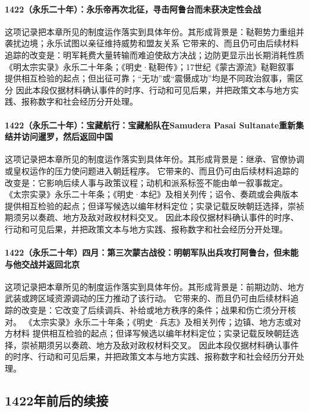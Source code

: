 \paragraph{1422（永乐二十年）：永乐帝再次北征，寻击阿鲁台而未获决定性会战} 这项记录把本章所见的制度运作落实到具体年份。其形成背景是：鞑靼势力重组并袭扰边境；永乐试图以亲征维持威势和盟友关系 它带来的、而且仍可由后续材料追踪的改变是：明军耗费大量转输而难迫使敌方决战；边防更显示出长期消耗性质 《明太宗实录》永乐二十年条；《明史·鞑靼传》；17世纪《蒙古源流》鞑靼叙事 提供相互检验的起点；但出征可靠；“无功”或“震慑成功”均是不同政治叙事，需区分 因此本段仅据材料确认事件的时序、行动和可见后果，并把政策文本与地方实践、报称数字和社会经历分开处理。

\paragraph{1422（永乐二十年）：宝藏航行：宝藏船队在Samudera Pasai Sultanate重新集结并访问暹罗，然后返回中国} 这项记录把本章所见的制度运作落实到具体年份。其形成背景是：继承、官僚协调或皇权运作的压力使问题进入朝廷程序。 它带来的、而且仍可由后续材料追踪的改变是：它影响后续人事与政策议程；动机和派系标签不能由单一叙事裁定。 《太宗实录》永乐二十年条；《明史·本纪》及相关列传；诏令、奏疏或会典版本 提供相互检验的起点；但译写候选以编年材料定位；实录记载反映朝廷选择，崇祯期须另以奏疏、地方及敌对政权材料交叉。 因此本段仅据材料确认事件的时序、行动和可见后果，并把政策文本与地方实践、报称数字和社会经历分开处理。

\paragraph{1422（永乐二十年）四月：第三次蒙古战役：明朝军队出兵攻打阿鲁台，但未能与他交战并返回北京} 这项记录把本章所见的制度运作落实到具体年份。其形成背景是：前期边防、地方武装或跨区域资源调动的压力推动了该行动。 它带来的、而且仍可由后续材料追踪的改变是：它改变了后续调兵、补给或地方秩序的条件；战果和伤亡须分开核对。 《太宗实录》永乐二十年条；《明史·兵志》及相关列传；边镇、地方志或对方材料 提供相互检验的起点；但译写候选以编年材料定位；实录记载反映朝廷选择，崇祯期须另以奏疏、地方及敌对政权材料交叉。 因此本段仅据材料确认事件的时序、行动和可见后果，并把政策文本与地方实践、报称数字和社会经历分开处理。

\subsection{1422年前后的续接}

